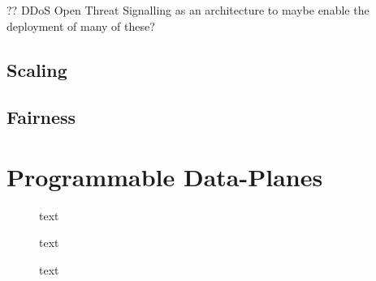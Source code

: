 ?? DDoS Open Threat Signalling \cite{ietf-dots-use-cases-17} as an architecture to maybe enable the deployment of many of these?

\subsection{Scaling}

\subsection{Fairness}

\section{Programmable Data-Planes}

\begin{figure}
	\caption{text}\label{fig:pdp-lit-steering}
\end{figure}

\begin{figure}
	\caption{text}\label{fig:pdp-lit-pci}
\end{figure}

\begin{figure}
	\caption{text}\label{fig:pdp-lit-offloading}
\end{figure}

